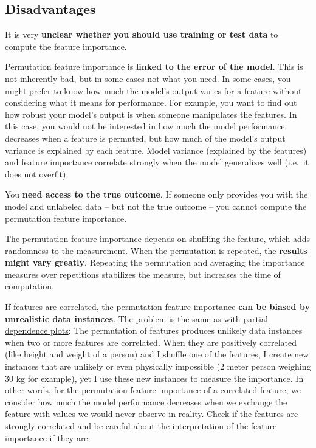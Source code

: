 \documentclass[12pt,]{krantz}
\begin{document}
\subsection{Disadvantages}\label{disadvantages-9}

It is very \textbf{unclear whether you should use training or test data}
to compute the feature importance.

Permutation feature importance is \textbf{linked to the error of the
model}. This is not inherently bad, but in some cases not what you need.
In some cases, you might prefer to know how much the model's output
varies for a feature without considering what it means for performance.
For example, you want to find out how robust your model's output is when
someone manipulates the features. In this case, you would not be
interested in how much the model performance decreases when a feature is
permuted, but how much of the model's output variance is explained by
each feature. Model variance (explained by the features) and feature
importance correlate strongly when the model generalizes well (i.e.~it
does not overfit).

You \textbf{need access to the true outcome}. If someone only provides
you with the model and unlabeled data -- but not the true outcome -- you
cannot compute the permutation feature importance.

The permutation feature importance depends on shuffling the feature,
which adds randomness to the measurement. When the permutation is
repeated, the \textbf{results might vary greatly}. Repeating the
permutation and averaging the importance measures over repetitions
stabilizes the measure, but increases the time of computation.

If features are correlated, the permutation feature importance
\textbf{can be biased by unrealistic data instances}. The problem is the
same as with \protect\hyperlink{pdp}{partial dependence plots}: The
permutation of features produces unlikely data instances when two or
more features are correlated. When they are positively correlated (like
height and weight of a person) and I shuffle one of the features, I
create new instances that are unlikely or even physically impossible (2
meter person weighing 30 kg for example), yet I use these new instances
to measure the importance. In other words, for the permutation feature
importance of a correlated feature, we consider how much the model
performance decreases when we exchange the feature with values we would
never observe in reality. Check if the features are strongly correlated
and be careful about the interpretation of the feature importance if
they are.
\end{document}
